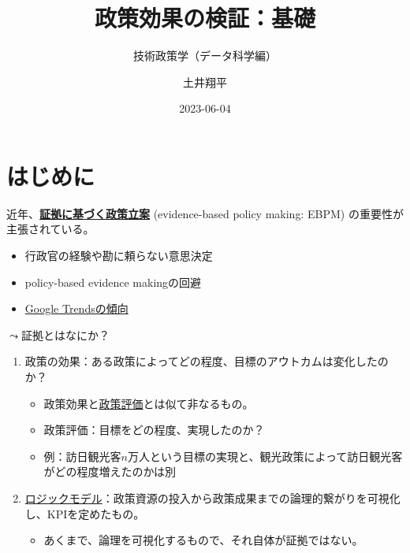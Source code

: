 \documentclass[
  xelatex,
  ja=standard]{bxjsarticle}
\title{政策効果の検証：基礎}
\subtitle{技術政策学（データ科学編）}
\author{土井翔平}
\date{2023-06-04}
\providecommand{\tightlist}{%
  \setlength{\itemsep}{0pt}\setlength{\parskip}{0pt}}\usepackage{longtable,booktabs,array}
\begin{document}
\maketitle
\ifdefined\Shaded\renewenvironment{Shaded}{\begin{tcolorbox}[boxrule=0pt, borderline west={3pt}{0pt}{shadecolor}, sharp corners, interior hidden, enhanced, frame hidden, breakable]}{\end{tcolorbox}}\fi

\hypertarget{ux306fux3058ux3081ux306b}{%
\section*{はじめに}\label{ux306fux3058ux3081ux306b}}

近年、\href{https://www.cao.go.jp/others/kichou/ebpm/ebpm.html}{\textbf{証拠に基づく政策立案}}
(evidence-based policy making: EBPM) の重要性が主張されている。

\begin{itemize}
\tightlist
\item
  行政官の経験や勘に頼らない意思決定
\item
  policy-based evidence makingの回避
\item
  \href{https://trends.google.co.jp/trends/explore?date=today\%205-y\&geo=JP\&q=EBPM\&hl=ja}{Google
  Trendsの傾向}
\end{itemize}

\(\leadsto\)証拠とはなにか？

\begin{enumerate}
\def\labelenumi{\arabic{enumi}.}
\tightlist
\item
  政策の効果：ある政策によってどの程度、目標のアウトカムは変化したのか？

  \begin{itemize}
  \tightlist
  \item
    政策効果と\href{https://www.soumu.go.jp/main_sosiki/hyouka/seisaku_n/portal/index.html}{政策評価}とは似て非なるもの。
  \item
    政策評価：目標をどの程度、実現したのか？
  \item
    例：訪日観光客\(n\)万人という目標の実現と、観光政策によって訪日観光客がどの程度増えたのかは別
  \end{itemize}
\item
  \href{https://www.digital.go.jp/assets/contents/node/basic_page/field_ref_resources/5535bc46-b873-42a7-99d6-bb0b70e2470d/20211104_meeting_EBPM_17.pdf}{ロジックモデル}：政策資源の投入から政策成果までの論理的繋がりを可視化し、KPIを定めたもの。

  \begin{itemize}
  \tightlist
  \item
    あくまで、論理を可視化するもので、それ自体が証拠ではない。
  \end{itemize}
\end{enumerate}
\end{document}
